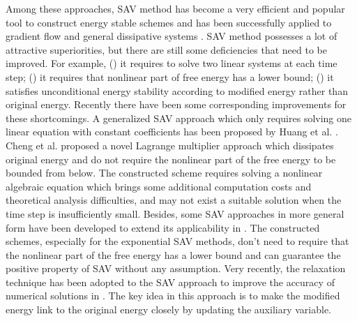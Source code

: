 \documentclass[final,review,onefignum,onetabnum]{siamart190516}
\theoremstyle{plain}
\begin{document}
Among these approaches, SAV method has become a very efficient and popular tool to construct energy stable schemes and has been successfully applied to gradient flow \cite{shen2018scalar, shen2019new, cheng2019highly, li2020stability, SheY20} and general dissipative systems \cite{ lin2019numerical, li2020error, li2020sav}. 
SAV method possesses a lot of attractive superiorities, but there are still some deficiencies that need to be improved. 
For example, 
() it requires to solve two linear systems at each time step;
() it requires that nonlinear part of free energy has a lower bound; 
() it satisfies unconditional energy stability according to modified energy rather than original energy. 
Recently there have been some corresponding improvements for these shortcomings. 
A generalized SAV approach which only requires solving one linear equation with constant coefficients has been proposed by Huang et al. \cite{huang2020highly, huang2021implicit}. Cheng et al.  \cite{cheng2020new, cheng2020global} proposed a novel Lagrange multiplier approach which dissipates original energy and do not require the nonlinear part of the free energy to be bounded from below. The constructed scheme 
requires solving a nonlinear algebraic equation which brings some additional computation costs and theoretical analysis difficulties, and may not exist a suitable solution when the time step is insufficiently small. Besides, some SAV approaches in more general form have been developed to extend its applicability in \cite{liu2020exponential, liu2021highly,cheng2021generalized}. The constructed schemes, especially for the exponential SAV methods, don't need to require that the nonlinear part of the free energy has a lower bound and can guarantee the positive property of SAV without any assumption. Very recently, the relaxation technique has been adopted to the SAV approach to improve the accuracy of numerical solutions  in \cite{jiang2021improving, zhang2022generalized}. The key idea in this approach is to make the modified energy link to the original energy closely by updating the auxiliary variable.   
\end{document}
